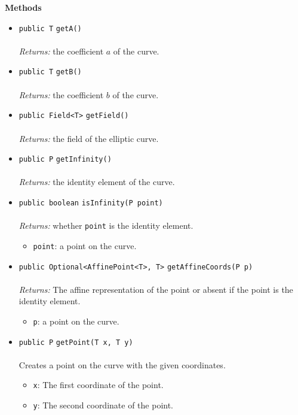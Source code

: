 \textbf{\sffamily Methods}
\begin{itemize}
\item \lstinline|public T| \lstinline|getA|\lstinline|()|\\ \\[-0.6em]
\emph{Returns:} the coefficient $a$ of the curve.



\item \lstinline|public T| \lstinline|getB|\lstinline|()|\\ \\[-0.6em]
\emph{Returns:} the coefficient $b$ of the curve.



\item \lstinline|public Field<T>| \lstinline|getField|\lstinline|()|\\ \\[-0.6em]
\emph{Returns:} the field of the elliptic curve.



\item \lstinline|public P| \lstinline|getInfinity|\lstinline|()|\\ \\[-0.6em]
\emph{Returns:} the identity element of the curve.



\item \lstinline|public boolean| \lstinline|isInfinity|\lstinline|(P point)|\\ \\[-0.6em]
\emph{Returns:} whether \lstinline|point| is the identity element.
\begin{itemize}
\item \lstinline|point|: a point on the curve.
\end{itemize}



\item \lstinline|public Optional<AffinePoint<T>, T>| \lstinline|getAffineCoords|\lstinline|(P p)|\\ \\[-0.6em]
\emph{Returns:} The affine representation of the point or absent if the point is
 the identity element.
\begin{itemize}
\item \lstinline|p|: a point on the curve.
\end{itemize}



\item \lstinline|public P| \lstinline|getPoint|\lstinline|(T x, T y)|\\ \\[-0.6em]
Creates a point on the curve with the given coordinates.
\begin{itemize}
\item \lstinline|x|: The first coordinate of the point.
\item \lstinline|y|: The second coordinate of the point.
\end{itemize}




\end{itemize}

